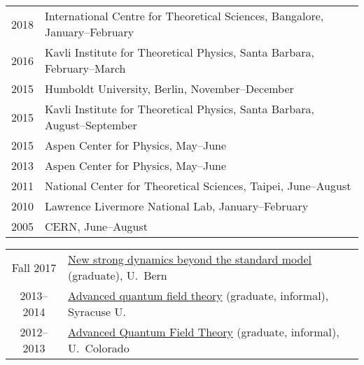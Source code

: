 \documentclass[10 pt]{article}
\renewcommand{\section}[2]%
    {\pagebreak[2]\vspace{1.3\baselineskip}%
     \hspace{0in}%
     \marginpar{
     \raggedright \scshape #1}#2}
\newcommand{\blankline}{\quad\pagebreak[2]}
\newcommand{\spacer}{\blankline\vspace{12 pt}\blankline}
\begin{document}
\vspace{-12 pt} %
\begin{tabular}[t]{cl}
  2018  & International Centre for Theoretical Sciences, Bangalore, January--February \\
  2016  & Kavli Institute for Theoretical Physics, Santa Barbara, February--March     \\
  2015  & Humboldt University, Berlin, November--December                             \\
  2015  & Kavli Institute for Theoretical Physics, Santa Barbara, August--September   \\
  2015  & Aspen Center for Physics, May--June                                         \\
  2013  & Aspen Center for Physics, May--June                                         \\
  2011  & National Center for Theoretical Sciences, Taipei, June--August              \\
  2010  & Lawrence Livermore National Lab, January--February                          \\
  2005  & CERN, June--August                                                          \\
\end{tabular}

\spacer



\section{Teaching} %

\vspace{-12 pt} %
\begin{tabular}[t]{cl}
  Fall 2017  & \href{http://www.davidschaich.net/teaching/1718F_BSM/index.html}{New strong dynamics beyond the standard model} (graduate), U.~Bern      \\
  2013--2014 & \href{http://www.davidschaich.net/teaching/1314_AdQFT/index.html}{Advanced quantum field theory} (graduate, informal), Syracuse U. \\
  2012--2013 & \href{http://www.davidschaich.net/teaching/1213_AdQFT/index.html}{Advanced Quantum Field Theory} (graduate, informal), U.~Colorado \\
\end{tabular}
\end{document}
